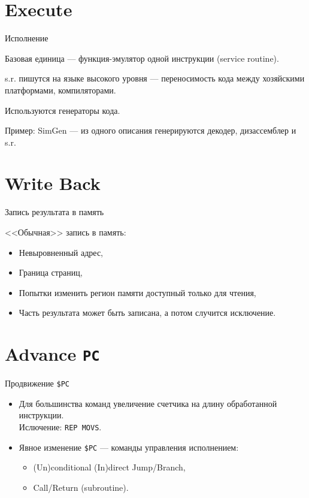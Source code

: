 \section{Execute}

\begin{frame}{Исполнение}

Базовая единица --- функция-эмулятор одной инструкции (service routine).

\bigskip

s.r. пишутся на языке высокого уровня --- переносимость кода между хозяйскими
платформами, компиляторами.

\bigskip

Используются генераторы кода.

Пример: SimGen --- из одного описания генерируются декодер, дизассемблер и s.r.

\end{frame}

\section{Write Back}

\begin{frame}{Запись результата в память}

<<Обычная>> запись в память:

\pause

\begin{itemize}
    \item Невыровненный адрес,
    \item Граница страниц,
    \item Попытки изменить регион памяти доступный только для чтения,
    \item Часть результата может быть записана, а потом случится исключение.
\end{itemize}

\end{frame}

\section{Advance \texttt{PC}}

\begin{frame}{Продвижение \texttt{\$PC}}

\begin{itemize}
    \item Для большинства команд увеличение счетчика на длину обработанной инструкции. \\
    Ислючение: \texttt{REP MOVS}.
    \pause\bigskip
    \item Явное изменение \texttt{\$PC} --- команды управления исполнением:
    \begin{itemize}
        \item (Un)conditional (In)direct Jump/Branch,
        \item Call/Return (subroutine).
    \end{itemize}
\end{itemize}

\end{frame}

